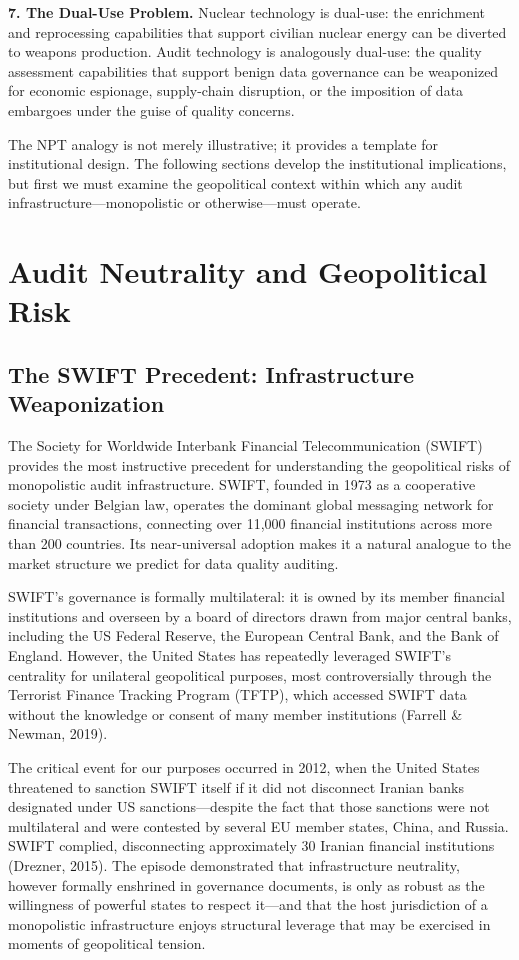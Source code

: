 \documentclass[12pt,a4paper]{ctexart}
\theoremstyle{definition}
\theoremstyle{remark}
\begin{document}
\textbf{7. The Dual-Use Problem.} Nuclear technology is dual-use: the enrichment and reprocessing capabilities that support civilian nuclear energy can be diverted to weapons production. Audit technology is analogously dual-use: the quality assessment capabilities that support benign data governance can be weaponized for economic espionage, supply-chain disruption, or the imposition of data embargoes under the guise of quality concerns.

The NPT analogy is not merely illustrative; it provides a template for institutional design. The following sections develop the institutional implications, but first we must examine the geopolitical context within which any audit infrastructure—monopolistic or otherwise—must operate.

\section{Audit Neutrality and Geopolitical Risk}

\subsection{The SWIFT Precedent: Infrastructure Weaponization}

The Society for Worldwide Interbank Financial Telecommunication (SWIFT) provides the most instructive precedent for understanding the geopolitical risks of monopolistic audit infrastructure. SWIFT, founded in 1973 as a cooperative society under Belgian law, operates the dominant global messaging network for financial transactions, connecting over 11,000 financial institutions across more than 200 countries. Its near-universal adoption makes it a natural analogue to the market structure we predict for data quality auditing.

SWIFT's governance is formally multilateral: it is owned by its member financial institutions and overseen by a board of directors drawn from major central banks, including the US Federal Reserve, the European Central Bank, and the Bank of England. However, the United States has repeatedly leveraged SWIFT's centrality for unilateral geopolitical purposes, most controversially through the Terrorist Finance Tracking Program (TFTP), which accessed SWIFT data without the knowledge or consent of many member institutions (Farrell \& Newman, 2019).

The critical event for our purposes occurred in 2012, when the United States threatened to sanction SWIFT itself if it did not disconnect Iranian banks designated under US sanctions—despite the fact that those sanctions were not multilateral and were contested by several EU member states, China, and Russia. SWIFT complied, disconnecting approximately 30 Iranian financial institutions (Drezner, 2015). The episode demonstrated that infrastructure neutrality, however formally enshrined in governance documents, is only as robust as the willingness of powerful states to respect it—and that the host jurisdiction of a monopolistic infrastructure enjoys structural leverage that may be exercised in moments of geopolitical tension.
\end{document}
